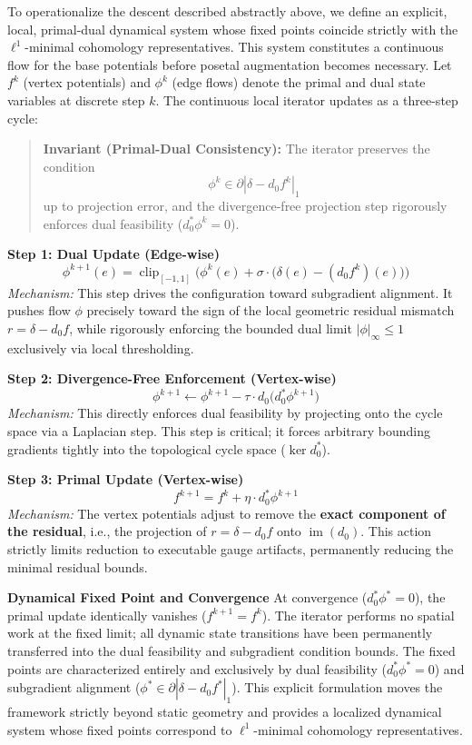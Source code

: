 \documentclass[
]{article}
\begin{document}
To operationalize the descent described abstractly above, we define an
explicit, local, primal-dual dynamical system whose fixed points
coincide strictly with the \(\ell^1\)-minimal cohomology
representatives. This system constitutes a continuous flow for the base
potentials before posetal augmentation becomes necessary. Let \(f^k\)
(vertex potentials) and \(\phi^k\) (edge flows) denote the primal and
dual state variables at discrete step \(k\). The continuous local
iterator updates as a three-step cycle:

\begin{quote}
\textbf{Invariant (Primal-Dual Consistency):} The iterator preserves the
condition \[ \phi^k \in \partial |\delta - d_0 f^k|_1 \] up to
projection error, and the divergence-free projection step rigorously
enforces dual feasibility (\(d_0^* \phi^k = 0\)).
\end{quote}

\textbf{Step 1: Dual Update (Edge-wise)}
\[ \phi^{k+1}(e) = \operatorname{clip}_{[-1,1]}\Big( \phi^k(e) + \sigma \cdot \big(\delta(e) - (d_0 f^k)(e)\big) \Big) \]
\emph{Mechanism:} This step drives the configuration toward subgradient
alignment. It pushes flow \(\phi\) precisely toward the sign of the
local geometric residual mismatch \(r = \delta - d_0 f\), while
rigorously enforcing the bounded dual limit \(|\phi|_\infty \leq 1\)
exclusively via local thresholding.

\textbf{Step 2: Divergence-Free Enforcement (Vertex-wise)}
\[ \phi^{k+1} \leftarrow \phi^{k+1} - \tau \cdot d_0 \big(d_0^* \phi^{k+1}\big) \]
\emph{Mechanism:} This directly enforces dual feasibility by projecting
onto the cycle space via a Laplacian step. This step is critical; it
forces arbitrary bounding gradients tightly into the topological cycle
space (\(\ker d_0^*\)).

\textbf{Step 3: Primal Update (Vertex-wise)}
\[ f^{k+1} = f^k + \eta \cdot d_0^* \phi^{k+1} \] \emph{Mechanism:} The
vertex potentials adjust to remove the \textbf{exact component of the
residual}, i.e., the projection of \(r = \delta - d_0 f\) onto
\(\operatorname{im}(d_0)\). This action strictly limits reduction to
executable gauge artifacts, permanently reducing the minimal residual
bounds.

\textbf{Dynamical Fixed Point and Convergence} At convergence
(\(d_0^* \phi^* = 0\)), the primal update identically vanishes
(\(f^{k+1} = f^k\)). The iterator performs no spatial work at the fixed
limit; all dynamic state transitions have been permanently transferred
into the dual feasibility and subgradient condition bounds. The fixed
points are characterized entirely and exclusively by dual feasibility
(\(d_0^* \phi^* = 0\)) and subgradient alignment
(\(\phi^* \in \partial |\delta - d_0 f^*|_1\)). This explicit
formulation moves the framework strictly beyond static geometry and
provides a localized dynamical system whose fixed points correspond to
\(\ell^1\)-minimal cohomology representatives.
\end{document}
